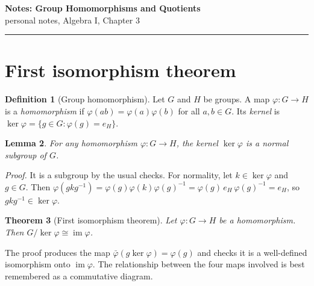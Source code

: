 \documentclass[11pt]{article}
\theoremstyle{plain}
\newtheorem{theorem}{Theorem}[section]
\newtheorem{lemma}[theorem]{Lemma}
\theoremstyle{definition}
\newtheorem{definition}[theorem]{Definition}
\theoremstyle{remark}
\begin{document}
\begin{center}
  {\Large\bfseries\color{accent} Notes: Group Homomorphisms and Quotients}\\[2pt]
  {\small personal notes, Algebra I, Chapter 3}
\end{center}

{\color{accent}\rule{\linewidth}{0.8pt}}

\section{First isomorphism theorem}

\begin{definition}[Group homomorphism]
Let $G$ and $H$ be groups. A map $\varphi : G \to H$ is a
\emph{homomorphism} if $\varphi(ab) = \varphi(a)\varphi(b)$ for all
$a, b \in G$. Its \emph{kernel} is
$\ker\varphi = \{ g \in G : \varphi(g) = e_H \}$.
\end{definition}

\begin{lemma}
For any homomorphism $\varphi : G \to H$, the kernel $\ker\varphi$ is a
normal subgroup of $G$.
\end{lemma}

\emph{Proof.} It is a subgroup by the usual checks. For normality, let
$k \in \ker\varphi$ and $g \in G$. Then
$\varphi(gkg^{-1}) = \varphi(g)\varphi(k)\varphi(g)^{-1}
  = \varphi(g)\,e_H\,\varphi(g)^{-1} = e_H$,
so $gkg^{-1} \in \ker\varphi$. \qedsymbol

\begin{theorem}[First isomorphism theorem]
Let $\varphi : G \to H$ be a homomorphism. Then
$G / \ker\varphi \cong \operatorname{im}\varphi$.
\end{theorem}

The proof produces the map $\bar\varphi(g\ker\varphi) = \varphi(g)$ and
checks it is a well-defined isomorphism onto $\operatorname{im}\varphi$.
The relationship between the four maps involved is best remembered as a
commutative diagram.

\begin{center}
\end{center}
\end{document}
